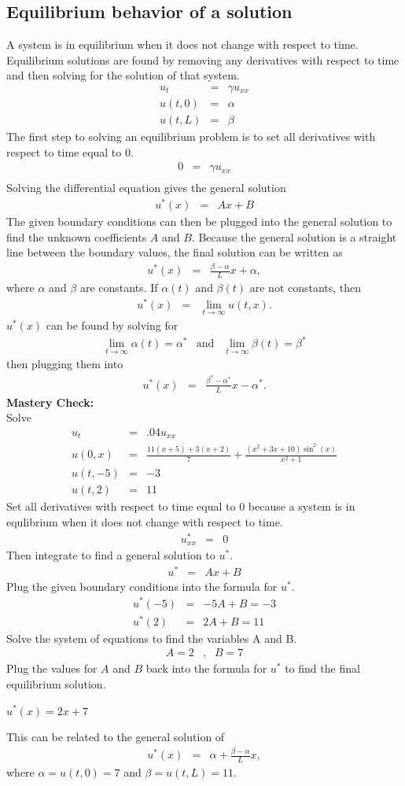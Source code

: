 \documentclass{article}
\newcommand{\bea}{\begin{eqnarray*}}
\newcommand{\eea}{\end{eqnarray*}}
\begin{document}
\subsection{Equilibrium behavior of a solution}
A system is in equilibrium when it does not change with respect to time. Equilibrium solutions are found by removing any derivatives with respect to time and then solving for the solution of that system.
\bea
u_t &=& \gamma u_{xx}\\
u(t,0) &=& \alpha\\
u(t,L) &=& \beta
\eea
The first step to solving an equilibrium problem is to set all derivatives with respect to time equal to $0$.
\bea
0 &=& \gamma u_{xx}\\
\eea
Solving the differential equation gives the general solution
\bea
u^{*}(x) &=& Ax+B
\eea
The given boundary conditions can then be plugged into the general solution to find the unknown coefficients $A$ and $B$. Because the general solution is a straight line between the boundary values, the final solution can be written as
\bea
u^*(x) &=& \frac{\beta-\alpha}{L}x + \alpha,
\eea
where $\alpha$ and $\beta$ are constants. If $\alpha(t)$ and $\beta(t)$ are not constants, then 
\bea
u^*(x) &=& \lim_{t\rightarrow\infty}{u(t,x)}.
\eea
$u^*(x)$ can be found by solving for
\bea
\lim_{t\rightarrow\infty}\alpha(t) = \alpha^* &\mbox{and}& \lim_{t\rightarrow\infty}\beta(t) = \beta^*
\eea
then plugging them into 
\bea
u^*(x) &=& \frac{\beta^*-\alpha^*}{L}x-\alpha^*.
\eea
\textbf{Mastery Check:}\\
Solve
\bea
u_t &=& .04u_{xx}\\
u(0,x) &=& \frac{11(x+5)+3(x+2)}{7}+\frac{(x^2+3x+10)\sin^2(x)}{x^2+1}\\
u(t,-5) &=& -3\\
u(t,2) &=& 11
\eea
Set all derivatives with respect to time equal to $0$ because a system is in equlibrium when it does not change with respect to time.
\bea
u_{xx}^{*} &=& 0
\eea
Then integrate to find a general solution to $u^*$.
\bea
u^{*} &=& Ax+B
\eea
Plug the given boundary conditions into the formula for $u^*$.
\bea
u^{*}(-5) &=& -5A+B = -3\\
u^{*}(2) &=& 2A+B = 11
\eea
Solve the system of equations to find the variables A and B.
\bea
A = 2 & , & B = 7
\eea
Plug the values for $A$ and $B$ back into the formula for $u^*$ to find the final equilibrium solution.
\begin{center}$\boxed{
u^{*}(x) = 2x+7
}$\end{center}
This can be related to the general solution of
\bea
u^*(x) &=& \alpha + \frac{\beta-\alpha}{L}x,
\eea
where $\alpha = u(t,0) = 7$ and $\beta = u(t,L) = 11$.
\end{document}
